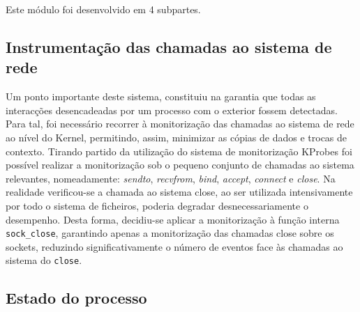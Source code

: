 

Este módulo foi desenvolvido em 4 subpartes. 



\subsection{Instrumentação das chamadas ao sistema de rede}
\label{sub:mon_syscalls}

Um ponto importante deste sistema, constituiu na garantia que todas as interacções desencadeadas por um processo com o exterior fossem detectadas. Para tal, foi necessário recorrer à monitorização das chamadas ao sistema de rede ao nível do Kernel, permitindo, assim, minimizar as cópias de dados e trocas de contexto. Tirando partido da utilização do sistema de monitorização KProbes foi possível realizar a monitorização sob o pequeno conjunto de chamadas ao sistema relevantes, nomeadamente: \textit{sendto}, \textit{recvfrom}, \textit{bind}, \textit{accept}, \textit{connect} e \textit{close}.
 Na realidade verificou-se a chamada ao sistema close, ao ser utilizada intensivamente por todo o sistema de ficheiros, poderia degradar desnecessariamente o desempenho. Desta forma, decidiu-se aplicar a monitorização à função interna \texttt{sock\_close}, garantindo apenas a monitorização das chamadas close sobre os sockets, reduzindo significativamente o número de eventos face às chamadas ao sistema do \texttt{close}.

\subsection{Estado do processo}
\label{sub:data_repository}

